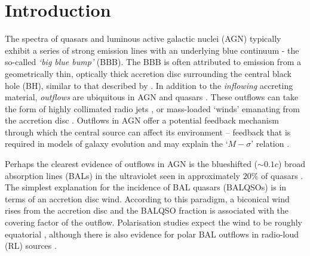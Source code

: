 \documentclass[useAMS,usenatbib]{mn2e_x}
\begin{document}


%
%

\section{Introduction}

The spectra of 
quasars and luminous active galactic nuclei (AGN) 
typically exhibit a series of strong emission lines
with an underlying blue continuum - the so-called {\sl `big blue bump'} (BBB). 
The BBB is often attributed to emission from a 
geometrically thin, optically thick accretion disc surrounding the central black hole (BH), similar to that described by \cite{shakurasunyaev1973}.
In addition to the {\em inflowing} accreting material, 
{\em outflows} are ubiquitous in AGN
and quasars \citep{kellerman1989,ganguly2008}. These outflows can take the form of 
highly collimated radio jets \citep[e.g.][]{hazard1963,potash1980,perley1984,marscher2006}, 
or mass-loaded `winds' emanating from the accretion disc 
\citep{weymann1991,turnermiller2009}. 
Outflows in AGN offer a 
potential feedback mechanism through which the central source can 
affect its environment \citep{king2003,king2005,fabian2012}
-- feedback that is required in models of galaxy evolution \citep{springel2005}
and may explain the `$M-\sigma$' relation \citep{silkrees1998,haring2004}.

Perhaps the clearest evidence of outflows in AGN is  
the blueshifted ($\sim 0.1c$) broad absorption lines (BALs) in the 
ultraviolet seen in approximately $20\%$ of quasars
\citep{weymann1991, reichard2003, knigge2008, turnermiller2009, allen2011}.
The simplest explanation for the incidence of 
BAL quasars (BALQSOs) is in terms of an accretion disc wind. 
According to this paradigm, a biconical wind rises from 
the accretion disc and the BALQSO fraction is associated with
the covering factor of the outflow. 
Polarisation studies expect the wind to be roughly equatorial
\citep{goodrich1995, cohen1995}, although there is also evidence
for polar BAL outflows  in radio-loud (RL) sources \citep{zhou2006,ghoshpunsly2007}.
\end{document}
